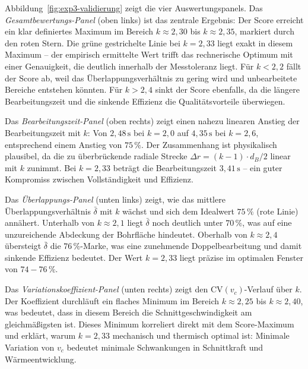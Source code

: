 ﻿\documentclass[12pt,a4paper]{article}
\begin{document}
Abbildung~\ref{fig:exp3-validierung} zeigt die vier Auswertungspanels. Das \textit{Gesamtbewertungs-Panel} (oben links) ist das zentrale Ergebnis: Der Score erreicht ein klar definiertes Maximum im Bereich $k \approx 2{,}30$ bis $k \approx 2{,}35$, markiert durch den roten Stern. Die grüne gestrichelte Linie bei $k = 2{,}33$ liegt exakt in diesem Maximum -- der empirisch ermittelte Wert trifft das rechnerische Optimum mit einer Genauigkeit, die deutlich innerhalb der Messtoleranz liegt. Für $k < 2{,}2$ fällt der Score ab, weil das Überlappungsverhältnis zu gering wird und unbearbeitete Bereiche entstehen könnten. Für $k > 2{,}4$ sinkt der Score ebenfalls, da die längere Bearbeitungszeit und die sinkende Effizienz die Qualitätsvorteile überwiegen.

Das \textit{Bearbeitungszeit-Panel} (oben rechts) zeigt einen nahezu linearen Anstieg der Bearbeitungszeit mit $k$: Von $2{,}48\,\text{s}$ bei $k = 2{,}0$ auf $4{,}35\,\text{s}$ bei $k = 2{,}6$, entsprechend einem Anstieg von $75\,\%$. Der Zusammenhang ist physikalisch plausibel, da die zu überbrückende radiale Strecke $\Delta r = (k - 1) \cdot d_B/2$ linear mit $k$ zunimmt. Bei $k = 2{,}33$ beträgt die Bearbeitungszeit $3{,}41\,\text{s}$ -- ein guter Kompromiss zwischen Vollständigkeit und Effizienz.

Das \textit{Überlappungs-Panel} (unten links) zeigt, wie das mittlere Überlappungsverhältnis $\bar{\delta}$ mit $k$ wächst und sich dem Idealwert $75\,\%$ (rote Linie) annähert. Unterhalb von $k \approx 2{,}1$ liegt $\bar{\delta}$ noch deutlich unter $70\,\%$, was auf eine unzureichende Abdeckung der Bohrfläche hindeutet. Oberhalb von $k \approx 2{,}4$ übersteigt $\bar{\delta}$ die $76\,\%$-Marke, was eine zunehmende Doppelbearbeitung und damit sinkende Effizienz bedeutet. Der Wert $k = 2{,}33$ liegt präzise im optimalen Fenster von $74{-}76\,\%$.

Das \textit{Variationskoeffizient-Panel} (unten rechts) zeigt den $\mathrm{CV}(v_c)$-Verlauf über $k$. Der Koeffizient durchläuft ein flaches Minimum im Bereich $k \approx 2{,}25$ bis $k \approx 2{,}40$, was bedeutet, dass in diesem Bereich die Schnittgeschwindigkeit am gleichmäßigsten ist. Dieses Minimum korreliert direkt mit dem Score-Maximum und erklärt, warum $k = 2{,}33$ mechanisch und thermisch optimal ist: Minimale Variation von $v_c$ bedeutet minimale Schwankungen in Schnittkraft und Wärmeentwicklung.
\end{document}
